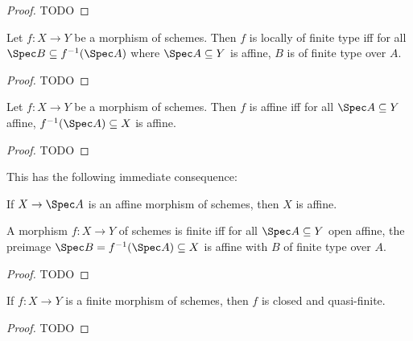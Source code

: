 \documentclass[wip, algebra]{bsteffan-lecturenotes}
\begin{document}
\begin{proof}
	TODO
\end{proof}
\begin{proposition}
	Let $f\colon X \to Y$ be a morphism of schemes.
	Then $f$ is locally of finite type iff for all $\Spec B \subseteq f^{-1}(\Spec A)$ where $\Spec A \subseteq Y$ is affine, $B$ is of finite type over $A$.
\end{proposition}
\begin{proof}
	TODO
\end{proof}
\begin{proposition}
	Let $f\colon X \to Y$ be a morphism of schemes.
	Then $f$ is affine iff for all $\Spec A \subseteq Y$ affine, $f^{-1}(\Spec A) \subseteq X$ is affine.
\end{proposition}
\begin{proof}
	TODO
\end{proof}
This has the following immediate consequence:
\begin{corollary}
	If $X \to \Spec A$ is an affine morphism of schemes, then $X$ is affine.
\end{corollary}
\begin{corollary}
	A morphism $f\colon X \to Y$ of schemes is finite iff for all $\Spec A \subseteq Y$ open affine, the preimage $\Spec B = f^{-1}(\Spec A) \subseteq X$ is affine with $B$ of finite type over $A$.
\end{corollary}
\begin{proof}
	TODO
\end{proof}
\begin{proposition}
	If $f\colon X \to Y$ is a finite morphism of schemes, then $f$ is closed and quasi-finite.
\end{proposition}
\begin{proof}
	TODO
\end{proof}
\end{document}
